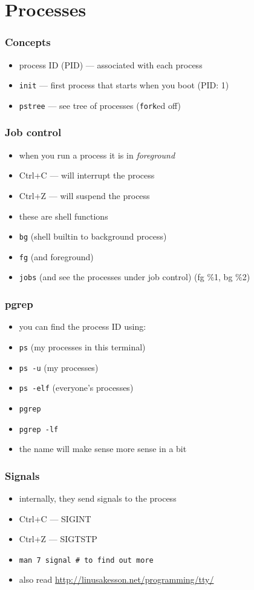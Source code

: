 \documentclass[%
        hyperref={%
                pdfauthor={Zakariyya Mughal},%
                pdfpagemode={None},pdfpagelayout={SinglePage}}%
        xcolor={x11names},%
]{beamer}
\begin{document}
\section{Processes}\frame{\insertsection}
\begin{frame}
	\frametitle{Concepts}
	\begin{itemize}
		\item process ID (PID) --- associated with each
			process
		\item \texttt{init} --- first process that starts when you
			boot (PID: 1)
		\item \texttt{pstree} --- see tree of processes
			(\texttt{fork}ed off)
	\end{itemize}
\end{frame}
\begin{frame}
	\frametitle{Job control}
	\begin{itemize}
		\item when you run a process it is in \emph{foreground}
		\item Ctrl+C --- will interrupt the process
		\item Ctrl+Z --- will suspend the process
		\pause\item these are shell functions
		\pause\item \texttt{bg} (shell builtin to background
			process)
		\pause\item \texttt{fg} (and foreground)
		\pause\item \texttt{jobs} (and see the processes under
			job control) (fg \%1, bg \%2)
	\end{itemize}
\end{frame}
\begin{frame}
	\frametitle{pgrep}
	\begin{itemize}
		\item you can find the process ID using:
		\item \texttt{ps} (my processes in this terminal)
		\item \texttt{ps -u} (my processes)
		\item \texttt{ps -elf} (everyone's processes)
		\pause\item \texttt{pgrep}
		\item \texttt{pgrep -lf}
		\item the name will make sense more sense in a bit
	\end{itemize}
\end{frame}
\begin{frame}
	\frametitle{Signals}
	\begin{itemize}
		\item internally, they send signals to the process
		\item Ctrl+C --- SIGINT
		\item Ctrl+Z --- SIGTSTP
		\pause\item \texttt{man 7 signal \# to find out more}
		\item also read \url{http://linusakesson.net/programming/tty/}
	\end{itemize}
\end{frame}
\end{document}
